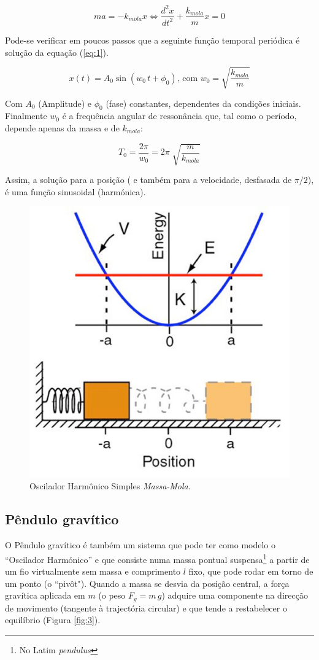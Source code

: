 \documentclass[a4paper,twoside,12pt]{article}      %
\begin{document}
\begin{equation}
	\label{eq:1} 
 m a = - k_{mola} x \Leftrightarrow \frac{d^2 x}{dt^2}  + \frac{k_{mola}}{m} x = 0
\end{equation}

Pode-se verificar em poucos passos que a seguinte função temporal periódica é solução da equação (\ref{eq:1}).

\begin{equation}
	\label{eq:solu_mola}
x(t) = A_0 \sin(w_0 \, t + \phi_0) \text{, com } w_0 = \sqrt{\frac{k_{mola}}{m}}
\end{equation}

Com $ A_0 $ (Amplitude) e $\phi_0$ (fase) constantes, dependentes da condições iniciais. Finalmente $w_0$ é a frequência angular de ressonância que, tal como o período, depende apenas da massa e de $k_{mola}$:

\begin{equation}
	\label{eq:period_mola}
T_0 = \frac{2 \pi}{w_0} = 2\pi\; \sqrt{\frac{m}{k_{mola}}}	
\end{equation}

Assim, a solução para a posição ( e também para a velocidade, desfasada de $\pi/2$), é uma função sinusoidal (harmónica).

\begin{figure}
	[!tbp] \centering 
	\includegraphics[width=0.5	\textwidth]{simple_harmonic_oscillator} 
	\caption{Oscilador Harmônico Simples \emph{Massa-Mola}.  \label{fig:2}} 
\end{figure}

\subsection{\sf Pêndulo gravítico}
O Pêndulo gravítico é também um sistema que pode ter como  modelo o ``Oscilador Harmónico'' e que consiste numa massa pontual suspensa\footnote{No Latim \emph{pendulus}} a partir de um fio virtualmente sem massa e comprimento $l$ fixo, que pode rodar em torno de um ponto (o ``pivôt"). Quando a massa se desvia da posição central, a força gravítica aplicada em $m$ (o peso $F_g = m \, g $) adquire uma componente na direcção de movimento (tangente à trajectória circular) e que tende a restabelecer o equilíbrio (Figura \ref{fig:3}). 
\end{document}
